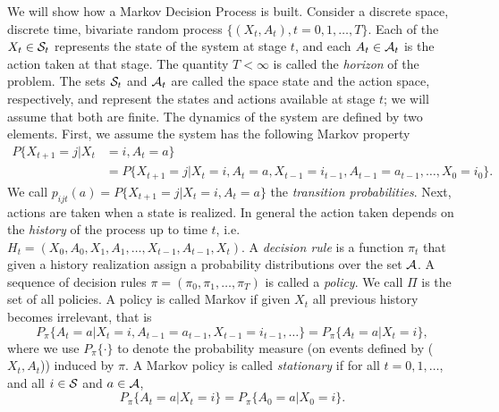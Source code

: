 \documentclass[11pt]{article}
\newcommand {\cA}{\ensuremath \mathcal{A}}
\newcommand {\cS}{\ensuremath \mathcal{S}}
\begin{document}
We will show how a Markov Decision Process  is built. Consider a discrete space, discrete time, bivariate random process $\{(X_t,A_t), t =0,1,\ldots,T \}$. Each of the $X_t \in \cS_t$ represents the state of the system at stage $t$, and each $A_t \in \cA_t$ is the action taken at that stage. The quantity $T<\infty$ is called the \emph{horizon} of the problem.
The sets $\cS_t$ and $\cA_t$ are called the space state and the action space,
respectively, and represent the states and actions available at stage $t$; we will assume that both are finite. The dynamics of the system are defined by two elements.
First, we assume the system has the  following Markov property
\begin{align*}
  P\{X_{t+1} =j|X_t &=i, A_t =a\} \\
& =  P\{X_{t+1} =j|X_t =i, A_t =a, X_{t-1} = i_{t-1}, A_{t-1} = a_{t-1} , \ldots,X_0=i_0\}.
\end{align*}
We call $p_{ijt}(a) = P\{X_{t+1} =j|X_t =i, A_t =a\}$ the \emph{transition probabilities}. Next, actions are taken when a state is realized.
In general the action taken depends on the \emph{history}  of the process up to time $t$, i.e. $H_t = (X_0,A_0,X_1,A_1,\ldots,X_{t-1},A_{t-1},X_t)$.
A \emph{decision rule} is a function $\pi_t$ that given a history realization assign a probability distributions over the set $\cA$.  A sequence of decision rules $\pi = (\pi_0, \pi_1,\ldots, \pi_T)$ is called a \emph{policy}. We call $\Pi$ is the set of all policies. A policy is called Markov if given $X_t$ all previous history becomes irrelevant, that is
\[P_\pi\{A_t=a|X_t=i,A_{t-1}=a_{t-1},X_{t-1}=i_{t-1},\ldots\} = P_\pi\{A_t=a|X_t=i\},\]
where we use $P_\pi\{\cdot\}$ to denote the probability measure (on events defined by ($X_t,A_t$)) induced by $\pi$. A Markov policy is called \emph{stationary} if for all $t=0,1,\ldots$, and all $i\in\cS$ and $a \in \cA$,
\[P_\pi\{A_t=a|X_t=i\}=P_\pi\{A_0=a|X_0=i\}.\]
\end{document}
